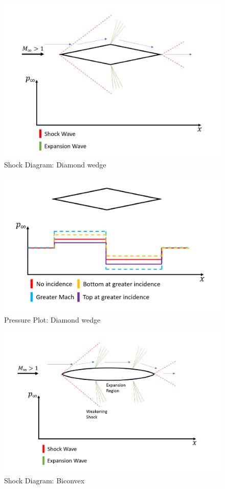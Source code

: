 \documentclass[../main.tex]{subfiles}
\begin{document}
\begin{figure}[h!]
    \centering
    \includegraphics[scale=0.5]{../../images/problem_2/fig_31.png}
    \caption{Shock Diagram: Diamond wedge}
    \label{diamond_shock}
\end{figure}

\begin{figure}[h!]
    \centering
    \includegraphics[scale=0.5]{../../images/problem_2/fig_32.png}
    \caption{Pressure Plot: Diamond wedge}
    \label{diamond_pressure}
\end{figure}

\begin{figure}[h!]
    \centering
    \includegraphics[scale=0.5]{../../images/problem_2/fig_41.png}
    \caption{Shock Diagram: Biconvex}
    \label{bi_shock}
\end{figure}
\end{document}
